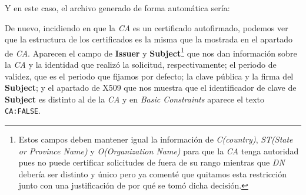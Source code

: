 \documentclass[a4paper, 11pt]{article}
\begin{document}
		Y en este caso, el archivo generado de forma automática sería:
		
		
		De nuevo, incidiendo en que la \textit{CA} es un certificado autofirmado, podemos ver que la estructura de los
		certificados es la misma que la mostrada en el apartado de \textit{CA}. Aparecen el campo de \textbf{Issuer} y
		\textbf{Subject}\footnote{Estos campos deben mantener igual la información de \textit{C(country)},
		\textit{ST(State or Province Name)} y \textit{O(Organization Name)} para que la \textit{CA} tenga autoridad pues no
		puede certificar solicitudes de fuera de su rango mientras que \textit{DN} debería ser distinto y único pero ya
		comenté que quitamos esta restricción junto con una justificación de por qué se tomó dicha decisión.} que nos dan
		información sobre la \textit{CA} y la identidad que realizó la solicitud, respectivamente; el periodo de validez,
		que es el periodo que fijamos por defecto; la clave pública y la firma del \textbf{Subject}; y el apartado de X509
		que nos muestra que el identificador de clave de \textbf{Subject} es distinto al de la \textit{CA} y en
		\textit{Basic Constraints} aparece el texto \verb|CA:FALSE|.
		
\end{document}
